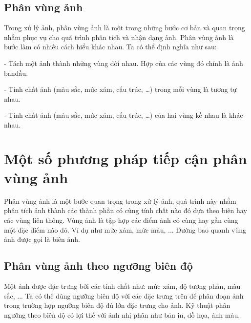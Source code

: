 \documentclass[12pt, oneside, a4paper]{book}
\begin{document}
\section{Phân vùng ảnh}
Trong xử lý ảnh, phân vùng ảnh là một trong những bước cơ bản và quan trọng nhằm phục vụ
cho quá trình phân tích và nhận dạng ảnh. Phân vùng ảnh là bước làm có nhiều cách hiểu khác
nhau. Ta có thể định nghĩa như sau:

- Tách một ảnh thành những vùng dời nhau. Hợp của các vùng đó chính là ảnh banđầu.

- Tính chất ảnh (màu sắc, mức xám, cấu trúc, …) trong mỗi vùng là tương tự nhau.

- Tính chất ảnh (màu sắc, mức xám, cấu trúc, …) của hai vùng kề nhau là khác nhau.
\chapter{Một số phương pháp tiếp cận phân vùng ảnh}
Phân vùng ảnh là một bước quan trọng trong xử lý ảnh, quá trình này nhằm phân tích ảnh thành các thành phần có cùng tính chất nào đó dựa theo biên hay các vùng liên thông. Vùng ảnh là tập hợp các điểm ảnh có cùng hay gần cùng một đặc điểm nào đó. Ví dụ như mức xám, mức màu, ... Đường bao quanh vùng ảnh được gọi là biên ảnh.
\section{Phân vùng ảnh theo ngưỡng biên độ}
Một ảnh được đặc trưng bởi các tính chất như: mức xám, độ tương phản, màu sắc, ... Ta có thể dùng ngưỡng biên độ với các đặc trưng trên để phân đoạn ảnh trong trường hợp ngưỡng biên độ đủ lớn đặc trưng cho ảnh. Kỹ thuật phân ngưỡng theo biên độ có lợi thế với ảnh nhị phân như bản in, đồ họa, ảnh màu.
\end{document}
